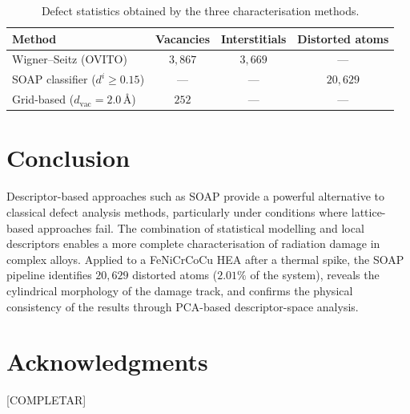 \documentclass[11pt]{article}
\begin{document}
\begin{table}[H]
  \centering
  \caption{Defect statistics obtained by the three characterisation methods.}
  \label{tab:comparison}
  \begin{tabular}{lccc}
    \toprule
    Method & Vacancies & Interstitials & Distorted atoms \\
    \midrule
    Wigner--Seitz (OVITO) & $3{,}867$ & $3{,}669$ & --- \\
    SOAP classifier ($d^i \geq 0.15$) & --- & --- & $20{,}629$ \\
    Grid-based ($d_{\mathrm{vac}} = 2.0$\,\AA) & $252$ & --- & --- \\
    \bottomrule
  \end{tabular}
\end{table}

\section{Conclusion}

Descriptor-based approaches such as SOAP provide a powerful alternative to
classical defect analysis methods, particularly under conditions where
lattice-based approaches fail. The combination of statistical modelling and
local descriptors enables a more complete characterisation of radiation damage
in complex alloys. Applied to a FeNiCrCoCu HEA after a thermal spike, the
SOAP pipeline identifies $20{,}629$ distorted atoms ($2.01\%$ of the system),
reveals the cylindrical morphology of the damage track, and confirms the
physical consistency of the results through PCA-based descriptor-space
analysis.

\section*{Acknowledgments}

[COMPLETAR]
\end{document}
